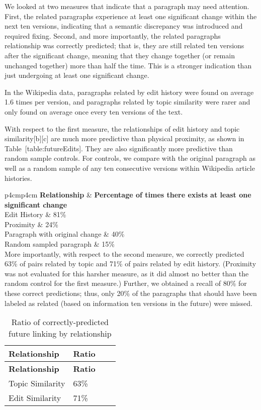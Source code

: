 We looked at two measures that indicate that a paragraph may need
attention. First, the related paragraphs experience at least one
significant change within the next ten versions, indicating that a
semantic discrepancy was introduced and required fixing. Second, and
more importantly, the related paragraphs relationship was correctly
predicted; that is, they are still related ten versions after the
significant change, meaning that they change together (or remain
unchanged together) more than half the time. This is a stronger
indication than just undergoing at least one significant change.

In the Wikipedia data, paragraphs related by edit history were found on
average 1.6 times per version, and paragraphs related by topic
similarity were rarer and only found on average once every ten versions
of the text.

With respect to the first measure, the relationships of edit history and
topic similarity{[}b{]}{[}c{]} are much more predictive than physical
proximity, as shown in Table~{[}table:futureEdits{]}. They are also
significantly more predictive than random sample controls. For controls,
we compare with the original paragraph as well as a random sample of any
ten consecutive versions within Wikipedia article histories.

{\textbar{}p{4cm}\textbar{}p{4cm}\textbar{}} \textbf{Relationship} \&
\textbf{Percentage of times there exists at least one significant
change}\\Edit History \& 81\%\\

Proximity \& 24\%\\

Paragraph with original change \& 40\%\\

Random sampled paragraph \& 15\%\\

More importantly, with respect to the second measure, we correctly
predicted 63\% of pairs related by topic and 71\% of pairs related by
edit history. (Proximity was not evaluated for this harsher measure, as
it did almost no better than the random control for the first measure.)
Further, we obtained a recall of 80\% for these correct predictions;
thus, only 20\% of the paragraphs that should have been labeled as
related (based on information ten versions in the future) were missed.

\begin{longtable}[c]{@{}llll@{}}
\caption{Ratio of correctly-predicted future linking by
relationship{}}\tabularnewline
\toprule
\textbf{Relationship} & \textbf{Ratio} & &\tabularnewline
\midrule
\endfirsthead
\toprule
\textbf{Relationship} & \textbf{Ratio} & &\tabularnewline
\midrule
\endhead
Topic Similarity & 63\% & &\tabularnewline
Edit Similarity & 71\% & &\tabularnewline
\bottomrule
\end{longtable}

